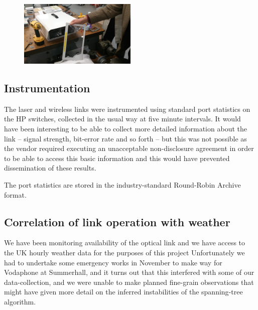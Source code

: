 \documentclass{amsart}
\begin{document}
\begin{figure}[h]
  \begin{center}
    \includegraphics[width=0.5\textwidth]{faulty}
  \end{center}
\end{figure}



\subsection{Instrumentation}

The laser and wireless links were instrumented using standard port
statistics on the HP switches, collected in the usual way at five
minute intervals. It would have been interesting to be able to collect
more detailed information about the link -- signal strength, bit-error
rate and so forth -- but this was not possible as the vendor required
executing an unacceptable non-disclosure agreement in order to be able to access this basic information and this would have prevented
dissemination of these results.

The port statistics are stored in the industry-standard Round-Robin
Archive format.


\subsection{Correlation of link operation with weather}
\label{sec:weather}

We have been monitoring availability of the optical link and we have
access to the UK hourly weather data for the purposes of this project
Unfortunately we had to undertake some emergency works in
November to make way for Vodaphone at Summerhall, and it turns out
that this interfered with some of our data-collection, and we were
unable to make planned fine-grain observations that might have given
more detail on the inferred instabilities of the spanning-tree algorithm.
\end{document}
